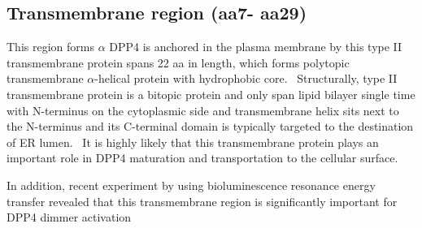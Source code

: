 \subsection{Transmembrane region (aa7- aa29)}

This region forms $\alpha$
DPP4 is anchored in the plasma membrane by this type II transmembrane protein spans 22 aa in length, which forms polytopic transmembrane $\alpha$-helical protein with hydrophobic core.~\cite{Hong_1990} Structurally, type II transmembrane protein is a bitopic protein and only span lipid bilayer single time with N-terminus on the cytoplasmic side and transmembrane helix sits next to the N-terminus and its C-terminal domain is typically targeted to the destination of ER lumen.~\cite{Luckey} It is highly likely that this transmembrane protein plays an important role in DPP4 maturation and transportation to the cellular surface. 
\par 
In addition, recent experiment by \citet{Chung_2010} using bioluminescence resonance energy transfer revealed that this transmembrane region is significantly important for DPP4 dimmer activation 
